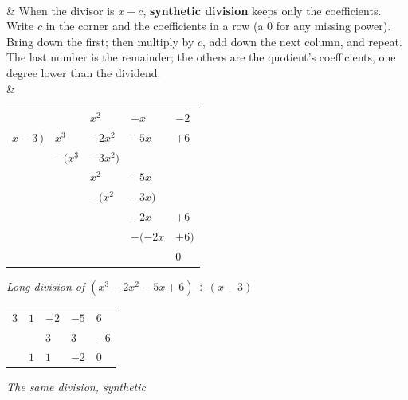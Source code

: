 \documentclass[10pt]{article}
\newcommand{\dstrut}{\rule[-3.5pt]{0pt}{12pt}}
\begin{document}
\begin{guidednotes}
\\ \hline
 &
When the divisor is $x - c$, \textbf{synthetic division} keeps only the coefficients. Write
$c$ in the corner and the coefficients in a row (a $0$ for any missing power). Bring down the
first; then multiply by $c$, add down the next column, and repeat. The last number is the
remainder; the others are the quotient's coefficients, one degree lower than the dividend.
\\
& \begin{minipage}[c]{0.56\linewidth}\centering
{\setlength{\tabcolsep}{1.5pt}\begin{tabular}{@{}>{\dstrut}r@{\,}TTTT@{}}
             &          & \textbf{\color{plum}$x^2$} & \textbf{\color{plum}$+x$} & \textbf{\color{plum}$-2$} \\ 
 $x-3\,\big)$ & $x^3$    & $-2x^2$  & $-5x$    & $+6$   \\
             & $-(x^3$  & $-3x^2)$ &          &        \\ 
             &          & $x^2$    & $-5x$    &        \\
             &          & $-(x^2$  & $-3x)$   &        \\ 
             &          &          & $-2x$    & $+6$   \\
             &          &          & $-(-2x$  & $+6)$  \\ 
             &          &          &          & \textbf{\color{redacc}$0$} \\
\end{tabular}}

\vspace{2pt}
{\footnotesize\itshape Long division of $(x^3 - 2x^2 - 5x + 6) \div (x - 3)$}
\end{minipage}\hfill
\begin{minipage}[c]{0.42\linewidth}\centering
{\setlength{\tabcolsep}{2pt}\begin{tabular}{@{}>{\dstrut}K|KKKK@{}}
 $3$ & $1$ & $-2$ & $-5$ & $6$ \\
     &     & $3$  & $3$  & $-6$ \\ 
     & \textbf{\color{plum}$1$} & \textbf{\color{plum}$1$} & \textbf{\color{plum}$-2$} & \textbf{\color{redacc}$0$} \\
\end{tabular}}

\vspace{2pt}
{\footnotesize\itshape The same division, synthetic}


\end{minipage}
\end{guidednotes}
\end{document}
